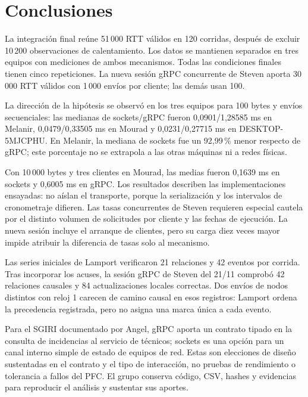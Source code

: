 \section{Conclusiones}
\label{sec:conclusiones}
La integración final reúne 51\,000 RTT válidos en 120 corridas,
después de excluir 10\,200 observaciones de calentamiento. Los datos
se mantienen separados en tres equipos con mediciones de ambos
mecanismos. Todas las condiciones finales tienen cinco repeticiones.
La nueva sesión gRPC concurrente de Steven aporta 30\,000 RTT válidos
con 1\,000 envíos por cliente; las demás usan 100.

La dirección de la hipótesis se observó en los tres equipos para
100 bytes y envíos secuenciales: las medianas de sockets/gRPC fueron
0,0901/1,28585 ms en Melanir, 0,0479/0,33505 ms en Mourad y
0,0231/0,27715 ms en DESKTOP-5MJCPHU. En Melanir, la mediana de
sockets fue un 92,99\,\% menor respecto de gRPC; este porcentaje
no se extrapola a las otras máquinas ni a redes físicas.

Con 10\,000 bytes y tres clientes en Mourad, las medias fueron
0,1639 ms en sockets y 0,6005 ms en gRPC. Los resultados describen
las implementaciones ensayadas: no aíslan el transporte, porque
la serialización y los intervalos de cronometraje difieren. Las
tasas concurrentes de Steven requieren especial cautela por el
distinto volumen de solicitudes por cliente y las fechas de ejecución.
La nueva sesión incluye el arranque de clientes, pero su carga diez
veces mayor impide atribuir la diferencia de tasas solo al mecanismo.

Las series iniciales de Lamport verificaron 21 relaciones y 42
eventos por corrida. Tras incorporar los acuses, la sesión gRPC de
Steven del 21/11 comprobó 42 relaciones causales y 84 actualizaciones
locales correctas. Dos envíos de nodos distintos con reloj 1 carecen
de camino causal en esos registros: Lamport ordena la precedencia
registrada, pero no asigna una marca única a cada evento.

Para el SGIRI documentado por Angel, gRPC aporta un contrato tipado
en la consulta de incidencias al servicio de técnicos; sockets es
una opción para un canal interno simple de estado de equipos de red.
Estas son elecciones de diseño sustentadas en el contrato y el tipo
de interacción, no pruebas de rendimiento o tolerancia a fallos del
PFC. El grupo conserva código, CSV, hashes y evidencias para reproducir
el análisis y sustentar sus aportes.
